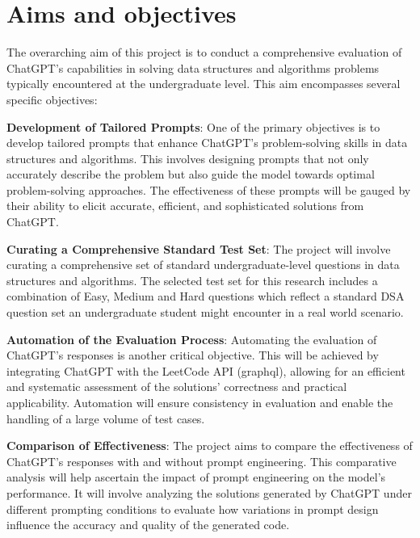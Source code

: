 \section{Aims and objectives}
\label{sec:intro_aims_obj}


The overarching aim of this project is to conduct a comprehensive evaluation of ChatGPT's 
capabilities in solving data structures and algorithms problems typically encountered at the 
undergraduate level. This aim encompasses several specific objectives:

\textbf{Development of Tailored Prompts}: One of the primary objectives is to develop tailored 
prompts that enhance ChatGPT’s problem-solving skills in data structures and algorithms. This 
involves designing prompts that not only accurately describe the problem but also guide the 
model towards optimal problem-solving approaches. The effectiveness of these prompts will be 
gauged by their ability to elicit accurate, efficient, and sophisticated solutions from ChatGPT.

\textbf{Curating a Comprehensive Standard Test Set}: The project will involve curating a 
comprehensive set of standard undergraduate-level questions in data structures and algorithms. 
The selected test set for this research includes a combination of Easy, Medium and Hard questions which reflect a standard DSA question set an undergraduate student might encounter in a real world scenario.

\textbf{Automation of the Evaluation Process}: Automating the evaluation of ChatGPT’s responses 
is another critical objective. This will be achieved by integrating ChatGPT with the LeetCode 
API (graphql), allowing for an efficient and systematic assessment of the solutions' correctness and 
practical applicability. Automation will ensure consistency in evaluation and enable the 
handling of a large volume of test cases.

\textbf{Comparison of Effectiveness}: The project aims to compare the effectiveness of 
ChatGPT's responses with and without prompt engineering. This comparative analysis will help 
ascertain the impact of prompt engineering on the model's performance. It will involve 
analyzing the solutions generated by ChatGPT under different prompting conditions to evaluate 
how variations in prompt design influence the accuracy and quality of the generated code.

